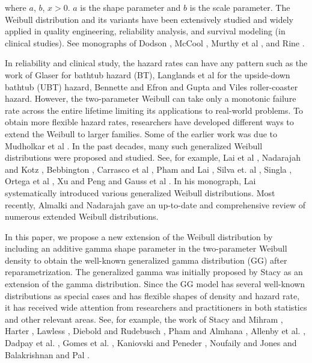 \documentclass{ps}
\theoremstyle{plain}%
\theoremstyle{definition}
\theoremstyle{remark}
\begin{document}
\noindent where $a$, $b$, $x > 0$.  $a$ is the shape parameter and $b$ is the scale parameter. The Weibull distribution and its variants have been extensively studied and widely applied in quality engineering, reliability analysis, and survival modeling (in clinical studies). See monographs of Dodson \cite{Dodson-2006}, McCool \cite{McCool-2012}, Murthy et al \cite{ Murthy-Xie-Jiang-2004}, and Rine \cite{Rine-2008}. 


In reliability and clinical study, the hazard rates can have any pattern such as the work of Glaser \cite{Glaser-1980}  for bathtub hazard (BT),  Langlands et al  \cite{Langlands-Pocock-Kerr-Gore-1979} for the upside-down bathtub (UBT) hazard,  Bennette \cite{Bennette-1983} and Efron \cite{Efron-1988} and Gupta and Viles \cite{Gupta-Viles-2013}  roller-coaster hazard. However, the two-parameter Weibull can take only a monotonic failure rate across the entire lifetime limiting its applications to real-world problems. To obtain more flexible hazard rates, researchers have developed different ways to extend the Weibull to larger families. Some of the earlier work was due to Mudholkar et al \cite{Mudholkar-Srivastava-1993, Mudholkar-Srivastava-Freimer-1995, Mudholkar-Srivastava-Kollia-1996}. In the past decades, many such generalized Weibull distributions were proposed and studied. See, for example, Lai et al \cite{Lai-Xie-Murthy-2003},  Nadarajah and Kotz \cite{Nadarajah-Kotz-2005}, Bebbington \cite{Bebbington-Lai-Zitikis-2007},  Carrasco et al \cite{Carrasco-Ortega-Cordeiro-2008}, Pham and Lai \cite{Pham-Lai-2007}, Silva et. al \cite{Silva-Ortega-Cordeiro-2010},  Singla \cite{Singla-Jain-Sharma-2012},  Ortega et al \cite{Ortega-Cordeiro-Kattan-2013}, Xu and Peng \cite{Xu-Peng-2014} and Gauss et al \cite{Gauss-Cordeiro-Lima-Gomes-Silva-Ortega-2016}. In his monograph, Lai \cite{Lai-2013} systematically introduced various generalized Weibull distributions. Most recently, Almalki and Nadarajah \cite{Almalki-Nadarajah-2014} gave an up-to-date and comprehensive review of numerous extended Weibull distributions.


In this paper, we propose a new extension of the Weibull distribution by including an additive gamma shape parameter in the two-parameter Weibull density to obtain the well-known generalized gamma distribution (GG) after reparametrization. The generalized gamma was initially proposed by Stacy \cite{Stacy-1962} as an extension of the gamma distribution. Since the GG model has several well-known distributions as special cases and has flexible shapes of density and hazard rate, it has received wide attention from researchers and practitioners in both statistics and other relevant areas. See, for example, the work of Stacy and Mihram \cite{Stacy-Mihram-1965}, Harter \cite{Harter-1967}, Lawless \cite{Lawless-1980},  Diebold and Rudebusch \cite{Diebold-Rudebusch-1990}, Pham and Almhana \cite{Pham-Almhana-1995}, Allenby et al. \cite{Allenby-Leone-Jen-1999}, Dadpay et al. \cite{Dadpay-Soofi-Soyer-2007}, Gomes et al. \cite{Gomes-Combes-Dussauchoy-2008}, Kaniovski and Peneder \cite{Kaniovski-Peneder-2008}, Noufaily and Jones \cite{Noufaily-Jones-2013a, Noufaily-Jones-2013b} and Balakrishnan and Pal \cite{Balakrishnan-Pal-2015}. 
\end{document}
